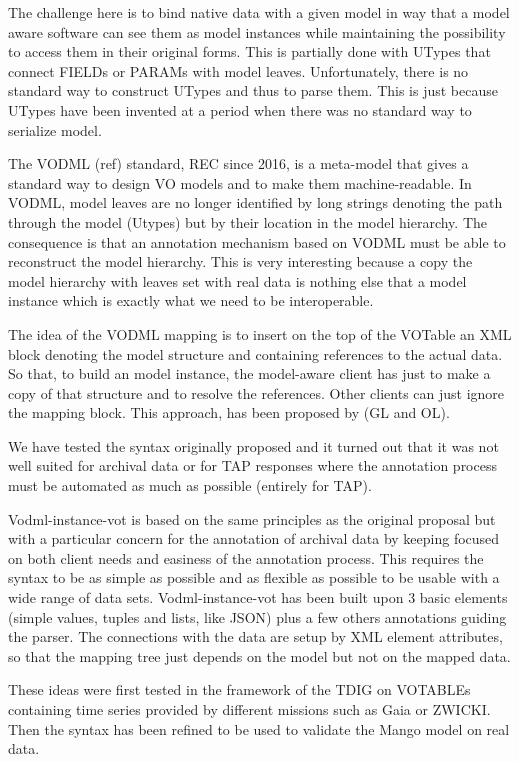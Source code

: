 \documentclass[11pt,a4paper]{ivoa}
\begin{document}
The challenge here is to bind native data with a given model in way that a model aware software can see them as model instances while maintaining the possibility to access them in their original forms.
This is partially done with UTypes that connect FIELDs or PARAMs with model leaves. Unfortunately, there is no standard way to construct UTypes and thus to parse them. This is just because UTypes have been invented at a period when there was no standard way to serialize model.

The VODML (ref) standard, REC since 2016,  is a meta-model that gives a standard way to design VO models and to make them machine-readable. In VODML, model leaves are no longer identified by long strings denoting the path through the model (Utypes) but by their location in the model hierarchy.
The consequence is that an annotation mechanism based on VODML must be able to reconstruct the model hierarchy. This is very interesting because a copy the model hierarchy with leaves set with real data is nothing else that a model instance which is exactly what we need to be interoperable.

The idea of the VODML mapping is to insert on the top of the VOTable an XML block denoting the model structure and containing references to the actual data.
So that, to build an model instance, the model-aware client has just to make a copy of that structure and to resolve the references. Other clients can just ignore the mapping block. This approach, has been proposed by (GL and OL). 

We have tested the syntax originally proposed and it turned out that it was not well suited for archival data or for TAP responses where the annotation process must be automated as much as possible (entirely for TAP). 

Vodml-instance-vot is based on the same principles as the original proposal but with a particular concern for the annotation of archival data by keeping focused on both client needs and easiness of the annotation process.
This requires the syntax to be as simple as possible and as flexible as possible to be usable with a wide range of data sets.
Vodml-instance-vot  has been built upon 3 basic elements (simple values,  tuples and  lists, like JSON)  plus a few others annotations guiding the parser.
The connections with the data are setup by XML element attributes, so that the mapping tree just depends on the model but not on the mapped data.

These ideas were first tested in the framework of the TDIG on VOTABLEs containing time series provided by different missions such as Gaia or ZWICKI. Then the syntax has been refined to be used to validate the Mango model on real data.
\end{document}

